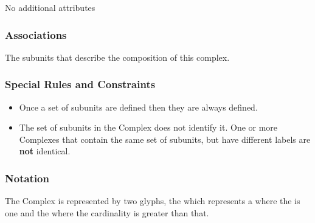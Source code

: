 No additional attributes 

\subsubsection{Associations}

\begin{attributes}
   The subunits that describe
  the composition of this complex.
 \end{attributes}


\subsubsection{Special Rules and Constraints}

\begin{itemize}
\item Once a set of subunits are defined then they are always defined.
\item The set of subunits in the Complex does not identify it. One or
  more Complexes that contain the same set of subunits, but have
  different labels are \textbf{not} identical.
\end{itemize}


\subsubsection{Notation}

The Complex is represented by two glyphs, the 
which represents a  where the 
is one and the  where the cardinality is
greater than that.

\paragraph{}

